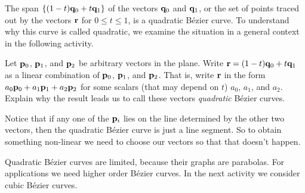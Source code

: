 The span $\{(1-t)\mathbf{q}_0 + t \mathbf{q}_1\}$ of the vectors $\mathbf{q}_0$ and $\mathbf{q}_1$, or the set of points traced out by the vectors $\mathbf{r}$ for $0 \leq t \leq 1$, is a quadratic B\'{e}zier curve. To understand why this curve is called quadratic, we examine the situation in a general context in the following activity.

\begin{pactivity} \label{act:1_d_quadratic_Bezier_general} 	Let $\mathbf{p}_0$, $\mathbf{p}_1$, and $\mathbf{p}_2$ be arbitrary vectors in the plane. Write $\mathbf{r} = (1-t)\mathbf{q}_0 + t\mathbf{q}_1$ as a linear combination of $\mathbf{p}_0$, $\mathbf{p}_1$, and $\mathbf{p}_2$. That is, write $\mathbf{r}$ in the form $a_0 \mathbf{p}_0 + a_1 \mathbf{p}_1 + a_2 \mathbf{p}_2$ for some scalars (that may depend on $t$) $a_0$, $a_1$, and $a_2$. Explain why the result leads us to call these vectors \emph{quadratic} B\'{e}zier curves. 


\end{pactivity}

Notice that if any one of the $\mathbf{p}_i$ lies on the line determined by the other two vectors, then the quadratic B\'{e}zier curve is just a line segment. So to obtain something non-linear we need to choose our vectors so that that doesn't happen. 

Quadratic B\'{e}zier curves are limited, because their graphs are parabolas. For applications we need higher order B\'{e}zier curves. In the next activity we consider  cubic B\'{e}zier curves. 

